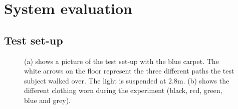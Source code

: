 \chapter{System evaluation}
\label{System_evaluation}



\section{Test set-up}

\begin{figure}
	\centering     %
	\label{fig:TestPicture}
	\caption{(a) shows a picture of the test set-up with the blue carpet. The white arrows on the floor represent the three different paths the test subject walked over. The light is suspended at 2.8m. (b) shows the different clothing worn during the experiment (black, red, green, blue and grey).\label{fig:Testsetup}}
\end{figure}

